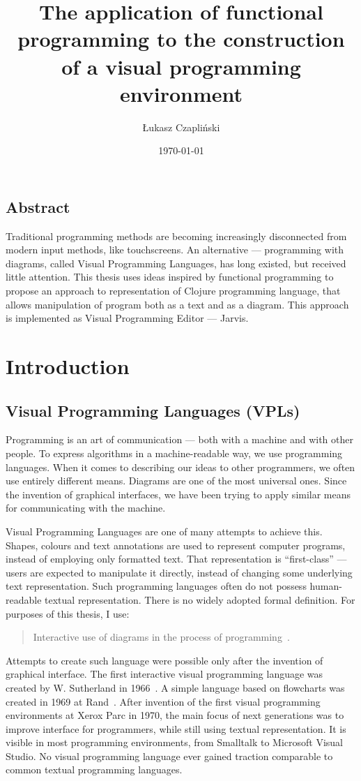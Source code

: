 \documentclass[11pt]{scrartcl}
\title{The application of functional programming to the construction of a visual
  programming environment}
\author{Łukasz Czapliński}
\date{\today}
\begin{document}
\maketitle

\subsection*{Abstract}
Traditional programming methods are becoming increasingly disconnected from
modern input methods, like touchscreens. An alternative --- programming with
diagrams, called Visual Programming Languages, has long existed, but received little
attention. This
thesis uses ideas inspired by functional programming to propose an approach to
representation of Clojure programming language,
that allows manipulation of program both as a text and as a diagram. This
approach is implemented as Visual Programming Editor --- Jarvis.

\section{Introduction}
\subsection{Visual Programming Languages (VPLs)}
Programming is an art of communication --- both with a machine and with other
people.
To express algorithms in a machine-readable way, we use programming languages.
When it comes to describing our ideas to other programmers, we often use
entirely different means.
Diagrams are one of the most universal ones.
Since the invention of graphical interfaces, we have been trying to apply
similar means for communicating with the machine.

Visual Programming Languages are one of many attempts to achieve this.
Shapes, colours and text annotations are used to represent computer programs,
instead of employing only formatted text.
That representation is “first-class” --- users are expected to manipulate it
directly, instead of changing some underlying text representation.
Such programming languages often do not possess human-readable textual
representation.
There is no widely adopted formal definition.
For purposes of this thesis, I use:
\blockquote{Interactive use of diagrams
  in the process of programming~\cite[Chapter 2]{nickerson1995visual}.}


Attempts to create such language were possible only after the invention of
graphical interface.
The first interactive visual programming language was created by W. Sutherland
in 1966~\cite{firstVPL}.
A simple language based on flowcharts was created in 1969 at Rand~\cite{grail}.
After invention of the first visual programming environments at Xerox Parc in
1970, the main focus of next generations was to improve interface for
programmers, while still using textual representation.
It is visible in most programming environments, from Smalltalk to Microsoft
Visual Studio.
No visual programming language ever gained traction comparable to common textual
programming languages.
\end{document}
